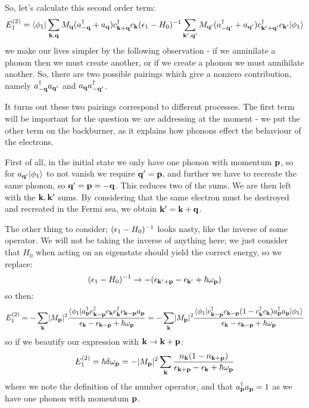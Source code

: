 So, let's calculate this second order term:
\begin{equation}
    E_1^{(2)} = \langle \phi_1 \rvert\sum_{\mathbf{k}, \mathbf{q}} M_{\mathbf{q}}(a^\dagger_{-\mathbf{q}} + a_{\mathbf{q}})c^\dagger_{\mathbf{k} + \mathbf{q}}c_{\mathbf{k}}(\epsilon_1 - H_0)^{-1}\sum_{\mathbf{k}', \mathbf{q}'} M_{\mathbf{q}'}(a^\dagger_{-\mathbf{q}'} + a_{\mathbf{q}'})c^\dagger_{\mathbf{k}' + \mathbf{q}'}c_{\mathbf{k}'}\lvert \phi_1 \rangle
\end{equation}
we make our lives simpler by the following observation - if we anninilate a phonon then we must create another, or if we create a phonon we must annihilate another. So, there are two possible pairings which give a nonzero contribution, namely $a^\dagger_{-\mathbf{q}}a_{\mathbf{q}'}$ and $a_{\mathbf{q}}a^\dagger_{-\mathbf{q}'}$.

It turns out these two pairings correspond to different processes. The first term will be important for the question we are addressing at the moment - we put the other term on the backburner, as it explains how phonons effect the behaviour of the electrons.

First of all, in the initial state we only have one phonon with momentum $\mathbf{p}$, so for $a_{\mathbf{q}'}\lvert \phi_1 \rangle$ to not vanish we require $\mathbf{q}' = \mathbf{p}$, and further we have to recreate the same phonon, so $\mathbf{q}' = \mathbf{p} = -\mathbf{q}$. This reduces two of the sums. We are then left with the $\mathbf{k}, \mathbf{k}'$ sums. By considering that the same electron must be destroyed and recreated in the Fermi sea, we obtain $\mathbf{k}' = \mathbf{k} + \mathbf{q}$. 

The other thing to consider; $(\epsilon_1 - H_0)^{-1}$ looks nasty, like the inverse of some operator. We will not be taking the inverse of anything here; we just consider that $H_0$ when acting on an eigenstate should yield the correct energy, so we replace:
\begin{equation}
    (\epsilon_1 - H_0)^{-1} \to -(\epsilon_{\mathbf{k}' + \mathbf{p}} - \epsilon_{\mathbf{k}'} + \hbar \omega_{\mathbf{p}})
\end{equation}
so then:
\begin{equation}
    E_1^{(2)} = -\sum_{\mathbf{k}}\lvert M_{\mathbf{p}} \rvert^2 \frac{\langle \phi_1 \rvert a^\dagger_{\mathbf{p}} c^\dagger_{\mathbf{k} - \mathbf{p}}c_{\mathbf{k}}c^\dagger_{\mathbf{k}} c_{\mathbf{k} - \mathbf{p}}a_{\mathbf{p}}}{\epsilon_{\mathbf{k}} - \epsilon_{\mathbf{k} - \mathbf{p}} + \hbar \omega_{\mathbf{p}}} = -\sum_{\mathbf{k}}\lvert M_{\mathbf{p}} \rvert^2 \frac{\langle \phi_1 \rvert c^\dagger_{\mathbf{k} - \mathbf{p}}c_{\mathbf{k} - \mathbf{p}}(1 - c^\dagger_{\mathbf{k}}c_{\mathbf{k}})a^\dagger_{\mathbf{p}}a_{\mathbf{p}} \lvert \phi_1 \rangle}{\epsilon_{\mathbf{k}} - \epsilon_{\mathbf{k} - \mathbf{p}} + \hbar \omega_{\mathbf{p}}}
\end{equation}
so if we beautify our expression with $\mathbf{k} \to \mathbf{k} + \mathbf{p}$:
\begin{equation}
    E_1^{(2)} = \hbar \delta \omega_{\mathbf{p}} = -\lvert M_{\mathbf{p}} \rvert^2 \sum_{\mathbf{k}}\frac{n_{\mathbf{k}}(1 - n_{\mathbf{k} + \mathbf{p}})}{\epsilon_{\mathbf{k} + \mathbf{p}} - \epsilon_{\mathbf{k}} + \hbar\omega_{\mathbf{p}}}
\end{equation}
where we note the definition of the number operator, and that $a^\dagger_{\mathbf{p}}a_{\mathbf{p}} = 1$ as we have one phonon with momentum $\mathbf{p}$. 

